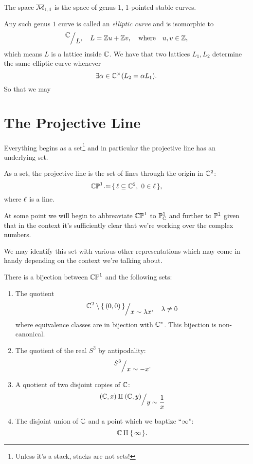 \documentclass[12pt]{memoir}
\begin{document}
\begin{Ex}
    The space $\overline{\mathcal{M}}_{1,1}$ is the space of genus 1, 1-pointed stable curves.\par
    Any such genus $1$ curve is called an \emph{elliptic curve} and is isomorphic to 
    $$\quot{\bC}{L},\quad L=\bZ u+\bZ v,\word{where}u,v\in\bZ,$$
    which means $L$ is a lattice inside $\mathbb{C}$. We have that two lattices $L_1,L_2$ determine the same elliptic curve whenever 
    $$\exists \alpha\in\mathbb{C}^\times(L_2=\alpha L_1).$$
    So that we may 
\end{Ex}
\iffalse
\section{The Projective Line}

Everything begins as a set\footnote{Unless it's a stack, stacks are not sets!} and in particular the projective line has an underlying set.

\begin{Def}
    As a set, the projective line is the set of lines through the origin in $\mathbb{C}^2$:
    $$\bCP^1\defeq \set{\l\subseteq \bC^2,\ 0\in \l},$$
    where $\ell$ is a line. 
\end{Def}

\begin{Rmk}
    At some point we will begin to abbreaviate $\mathbb{CP}^1$ to $\mathbb{P}^1_{\mathbb{C}}$ and further to $\mathbb{P}^1$ given that in the context it's sufficiently clear that we're working over the complex numbers.
\end{Rmk}

We may identify this set with various other representations which may come in handy depending on the context we're talking about.

\begin{Th}\label{thm-projective-line-as-set}
    There is a bijection between $\mathbb{CP}^1$ and the following sets:
    \begin{enumerate}
        \item The quotient 
        $$\quot{\bC^2\less\set{(0,0)}}{x\sim\la x},\quad\la\neq 0$$
        where equivalence classes are in bijection with $\mathbb{C}^\ast$. This bijection is non-canonical.
        \item The quotient of the real $S^3$ by antipodality:
        $$\quot{S^3}{x\sim-x}.$$
        \item A quotient of two disjoint copies of $\mathbb{C}$:
        $$\quot{(\bC,x)\amalg(\bC,y)}{y\sim\frac{1}{x}}$$
        \item The disjoint union of $\mathbb{C}$ and a point which we baptize ``$\infty$'':
        $$\mathbb{C}\amalg\{\,\infty\,\}.$$
    \end{enumerate}
\end{Th}
\end{document}
